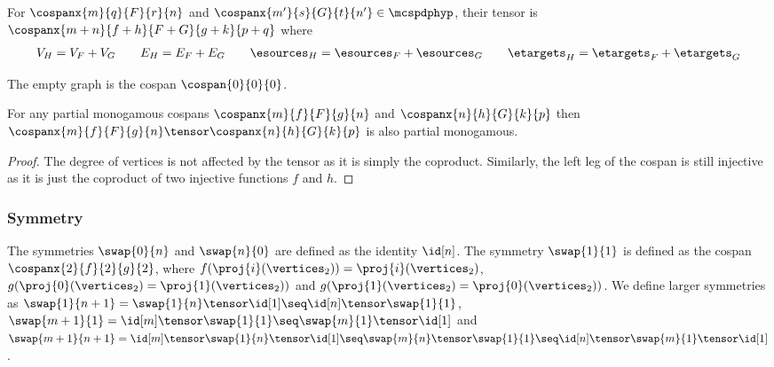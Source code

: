 \documentclass[10pt]{article}
\begin{document}
\begin{definition}[Tensor]
    For $\cospanx{m}{q}{F}{r}{n}$ and $\cospanx{m'}{s}{G}{t}{n'} \in \mcspdphyp$, their tensor is $\cospanx{m+n}{f+h}{F + G}{g+k}{p+q}$ where
    \begin{gather*}
        V_H = V_F + V_G \qquad E_H = E_F + E_G \qquad \esources_H = \esources_F + \esources_G \qquad \etargets_H = \etargets_F + \etargets_G
    \end{gather*}
\end{definition}

\begin{definition}[Empty]
    The empty graph is the cospan $\cospan{0}{0}{0}$.
\end{definition}

\begin{center}
    
\end{center}

\begin{proposition}
    For any partial monogamous cospans $\cospanx{m}{f}{F}{g}{n}$ and $\cospanx{n}{h}{G}{k}{p}$ then $\cospanx{m}{f}{F}{g}{n} \tensor \cospanx{n}{h}{G}{k}{p}$ is also partial monogamous.
\end{proposition}
\begin{proof}
    The degree of vertices is not affected by the tensor as it is simply the coproduct.
    Similarly, the left leg of the cospan is still injective as it is just the coproduct of two injective functions $f$ and $h$.
\end{proof}

\subsubsection{Symmetry}

\begin{center}
    
\end{center}

\begin{definition}[Symmetry]
    The symmetries $\swap{0}{n}$ and $\swap{n}{0}$ are defined as the identity $\id[n]$.
    The symmetry $\swap{1}{1}$ is defined as the cospan $\cospanx{2}{f}{2}{g}{2}$, where $f(\proj{i}(\vertices_2)) = \proj{i}(\vertices_2)$, $g(\proj{0}(\vertices_2) = \proj{1}(\vertices_2))$ and $g(\proj{1}(\vertices_2) = \proj{0}(\vertices_2))$.
    We define larger symmetries as $\swap{1}{n + 1} = \swap{1}{n} \tensor \id[1] \seq \id[n] \tensor \swap{1}{1}$, $\swap{m + 1}{1} = \id[m] \tensor \swap{1}{1} \seq \swap{m}{1} \tensor \id[1]$ and $\swap{m + 1}{n + 1} = \id[m] \tensor \swap{1}{n} \tensor \id[1] \seq \swap{m}{n} \tensor \swap{1}{1} \seq \id[n] \tensor \swap{m}{1} \tensor \id[1]$. 
\end{definition}
\end{document}
